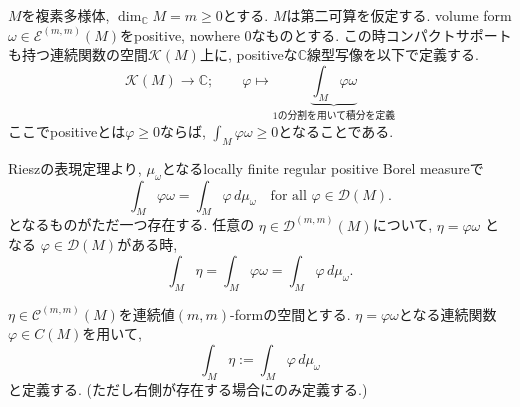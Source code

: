  $M$を複素多様体, $\dim_{\mathbb{C}}M=m\geq 0$とする. 
 $M$は第二可算を仮定する.
volume form $\omega\in\mathcal{E}^{(m,m)}(M)$をpositive, nowhere $0$なものとする. 
この時コンパクトサポートも持つ連続関数の空間$\mathcal{K}(M)$上に, positiveな$\mathbb{C}$線型写像を以下で定義する. 
\begin{equation*}
\mathcal{K}(M)\longrightarrow\mathbb{C};
\qquad
\varphi\longmapsto
\underbrace{\int_M\varphi\omega}_{\text{1の分割を用いて積分を定義}}
\end{equation*}
ここでpositiveとは$\varphi\geq 0$ならば, $\int_M\varphi\omega \ge 0$となることである. 

Rieszの表現定理より, $\mu_\omega$となるlocally finite regular positive Borel measureで
\begin{equation*}
\int_M\varphi\omega=\int_M\varphi\,d\mu_\omega
\quad
\text{for all }\varphi\in\mathcal{D}(M).
\end{equation*}
となるものがただ一つ存在する. 任意の $\eta\in\mathcal{D}^{(m,m)}(M)$について,  $\eta=\varphi\omega$ となる $\varphi\in\mathcal{D}(M)$がある時, 
\begin{equation*}
\int_M\eta
=
\int_M\varphi\omega
=
\int_M\varphi\,d\mu_\omega.
\end{equation*}

\begin{tcolorbox}[mybox]
\begin{defn}
\label{defn-M-measure}
 $\eta\in\mathcal{C}^{(m,m)}(M)$を連続値$(m,m)$-formの空間とする. $\eta=\varphi\omega$となる連続関数$\varphi\in C(M)$を用いて, 
\begin{equation*}
\int_M\eta:=\int_M\varphi\,d\mu_\omega
\end{equation*}
と定義する. (ただし右側が存在する場合にのみ定義する.)
\end{defn}
\end{tcolorbox}


